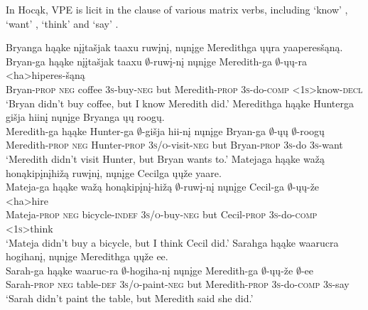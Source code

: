 \documentclass[output=paper]{LSP/langsci}
\begin{document}
 
In Hocąk, VPE is licit in the  clause of various matrix verbs, including `know' , `want' , `think'  and `say' .
 


 
\ea
\ea\label{ex:johnson:38a} 
\glll Bryanga hąąke {nįįtašjak taaxu} ruwįnį, nųnįge Meredithga ųųra yaaperesšąną.\\
Bryan-ga hąąke {nįįtašjak taaxu} $\emptyset$-ruwį-nį nųnįge Meredith-ga {\db}$\emptyset$-ųų-ra <ha>hiperes-šąną\\
Bryan-\textsc{prop} \textsc{neg} coffee \textsc{3s}-buy-\textsc{neg} but Meredith-\textsc{prop} \textsc{3s}-do-\textsc{comp} <\textsc{1s}>know-\textsc{decl}\\
\trans `Bryan didn't buy coffee, but I know Meredith did.'
\ex\label{ex:johnson:38b}
\glll Meredithga hąąke Hunterga {gišja hiinį} nųnįge Bryanga ųų roogų.\\
Meredith-ga hąąke Hunter-ga $\emptyset$-{gišja hii-nį} nųnįge Bryan-ga {\db}$\emptyset$-ųų $\emptyset$-roogų\\
Meredith-\textsc{prop} \textsc{neg} Hunter-\textsc{prop} \textsc{3s/o}-visit-\textsc{neg} but Bryan-\textsc{prop} \textsc{3s}-do \textsc{3s}-want\\
\trans `Meredith didn't visit Hunter, but Bryan wants to.'
\ex\label{ex:johnson:38c}
\glll Matejaga hąąke {wažą honąkipįnįhižą} ruwįnį, nųnįge Cecilga ųųže yaare.\\
Mateja-ga hąąke {wažą honąkipįnį-hižą} $\emptyset$-ruwį-nį nųnįge Cecil-ga {\db}$\emptyset$-ųų-že <ha>hire\\
Mateja-\textsc{prop} \textsc{neg} bicycle-\textsc{indef} \textsc{3s/o}-buy-\textsc{neg} but Cecil-\textsc{prop} \textsc{3s}-do-\textsc{comp} <\textsc{1s}>think\\
\trans `Mateja didn't buy a bicycle, but I think Cecil did.'
\ex\label{ex:johnson:38d}
\glll Sarahga hąąke waarucra hogihanį, nųnįge Meredithga ųųže ee.\\
Sarah-ga hąąke waaruc-ra $\emptyset$-hogiha-nį nųnįge Meredith-ga {\db}$\emptyset$-ųų-že $\emptyset$-ee\\
Sarah-\textsc{prop} \textsc{neg} table-\textsc{def} \textsc{3s/o}-paint-\textsc{neg} but Meredith-\textsc{prop} \textsc{3s}-do-\textsc{comp} \textsc{3s}-say\\
\trans `Sarah didn't paint the table, but Meredith said she did.'
\z
\z
\end{document}
